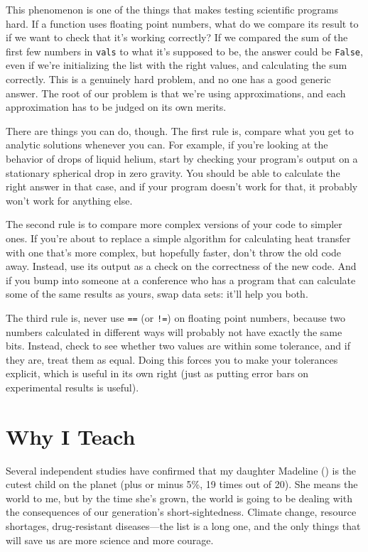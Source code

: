 This phenomenon is one of the things that makes testing scientific
programs hard. If a function uses floating point numbers, what do we
compare its result to if we want to check that it's working correctly?
If we compared the sum of the first few numbers in \texttt{vals} to what
it's supposed to be, the answer could be \texttt{False}, even if we're
initializing the list with the right values, and calculating the sum
correctly. This is a genuinely hard problem, and no one has a good
generic answer. The root of our problem is that we're using
approximations, and each approximation has to be judged on its own
merits.

There are things you can do, though. The first rule is, compare what you
get to analytic solutions whenever you can. For example, if you're
looking at the behavior of drops of liquid helium, start by checking
your program's output on a stationary spherical drop in zero gravity.
You should be able to calculate the right answer in that case, and if
your program doesn't work for that, it probably won't work for anything
else.

The second rule is to compare more complex versions of your code to
simpler ones. If you're about to replace a simple algorithm for
calculating heat transfer with one that's more complex, but hopefully
faster, don't throw the old code away. Instead, use its output as a
check on the correctness of the new code. And if you bump into someone
at a conference who has a program that can calculate some of the same
results as yours, swap data sets: it'll help you both.

The third rule is, never use \texttt{==} (or \texttt{!=}) on floating
point numbers, because two numbers calculated in different ways will
probably not have exactly the same bits. Instead, check to see whether
two values are within some tolerance, and if they are, treat them as
equal. Doing this forces you to make your tolerances explicit, which is
useful in its own right (just as putting error bars on experimental
results is useful).

\section{Why I Teach}


Several independent studies have confirmed that my daughter Madeline
() is the cutest child on the planet (plus or
minus 5\%, 19 times out of 20). She means the world to me, but by the
time she's grown, the world is going to be dealing with the
consequences of our generation's short-sightedness.  Climate change,
resource shortages, drug-resistant diseases---the list is a long one,
and the only things that will save us are more science and more
courage.

